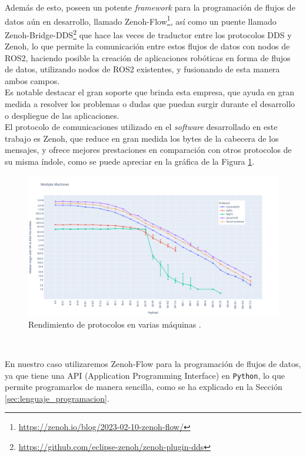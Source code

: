 Además de esto, poseen un potente \textit{framework} para la programación de
flujos de datos aún en desarrollo, llamado
Zenoh-Flow\footnote{\url{https://zenoh.io/blog/2023-02-10-zenoh-flow/}}, así
como un puente llamado
Zenoh-Bridge-DDS\footnote{\url{https://github.com/eclipse-zenoh/zenoh-plugin-dds}}
que hace las veces de traductor entre los protocolos DDS y Zenoh, lo que permite
la comunicación entre estos flujos de datos con nodos de ROS2, haciendo posible
la creación de aplicaciones robóticas en forma de flujos de datos, utilizando
nodos de ROS2 existentes, y fusionando de esta manera ambos campos.
\\

Es notable destacar el gran soporte que brinda esta empresa, que ayuda en gran
medida a resolver los problemas o dudas que puedan surgir durante el desarrollo o
despliegue de las aplicaciones.
\\

El protocolo de comunicaciones utilizado en el \textit{software} desarrollado en
este trabajo es Zenoh, que reduce en gran medida los bytes de la cabecera de los
mensajes, y ofrece mejores prestaciones en comparación con otros protocolos de
su misma índole, como se puede apreciar en la gráfica de la Figura
\ref{fig:zenoh_performance}.
\\

\begin{figure} [h!]
  \begin{center}
    \includegraphics[width=15cm]{figs/zenoh_performance}
  \end{center}
  \caption{Rendimiento de protocolos en varias máquinas \citep{zenoh_performance}.}
  \label{fig:zenoh_performance}
\end{figure}\

En nuestro caso utilizaremos Zenoh-Flow para la programación de flujos de datos,
ya que tiene una API (Application Programming Interface) en \texttt{Python}, lo
que permite programarlos de manera sencilla, como se ha explicado en la Sección
\ref{sec:lenguaje_programacion}.
\\

